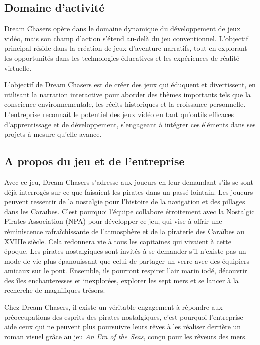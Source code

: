 \documentclass{article}
\begin{document}
\subsection{Domaine d’activité}\hfill

Dream Chasers opère dans le domaine dynamique du développement de jeux vidéo, mais son champ d'action s'étend au-delà du jeu conventionnel. L’objectif principal réside dans la création de jeux d’aventure narratifs, tout en explorant les opportunités dans les technologies éducatives et les expériences de réalité virtuelle.

L’objectif de Dream Chasers est de créer des jeux qui éduquent et divertissent, en utilisant la narration interactive pour aborder des thèmes importants tels que la conscience environnementale, les récits historiques et la croissance personnelle. L’entreprise reconnaît le potentiel des jeux vidéo en tant qu’outils efficaces d’apprentissage et de développement, s’engageant à intégrer ces éléments dans ses projets à mesure qu’elle avance.





\subsection{A propos du jeu et de l’entreprise}\hfill

Avec ce jeu, Dream Chasers s’adresse aux joueurs en leur demandant s'ils se sont déjà interrogés sur ce que faisaient les pirates dans un passé lointain. Les joueurs peuvent ressentir de la nostalgie pour l'histoire de la navigation et des pillages dans les Caraïbes. C'est pourquoi l’équipe collabore étroitement avec la Nostalgic Pirates Association (NPA) pour développer ce jeu, qui vise à offrir une réminiscence rafraîchissante de l'atmosphère et de la piraterie des Caraïbes au XVIIIe siècle. Cela redonnera vie à tous les capitaines qui vivaient à cette époque. Les pirates nostalgiques sont invités à se demander s'il n'existe pas un mode de vie plus épanouissant que celui de partager un verre avec des équipiers amicaux sur le pont. Ensemble, ils pourront respirer l'air marin iodé, découvrir des îles enchanteresses et inexplorées, explorer les sept mers et se lancer à la recherche de magnifiques trésors.

Chez Dream Chasers, il existe un véritable engagement à répondre aux préoccupations des esprits des pirates nostalgiques, c'est pourquoi l’entreprise aide ceux qui ne peuvent plus poursuivre leurs rêves à les réaliser derrière un roman visuel grâce au jeu \textit{An Era of the Seas}, conçu pour les rêveurs des mers.
\end{document}
